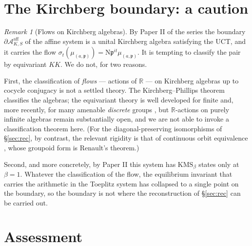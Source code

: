 \documentclass[11pt]{amsart}
\numberwithin{equation}{section}
\theoremstyle{definition}
\theoremstyle{remark}
\newtheorem{remark}[theorem]{Remark}
\newcommand{\R}{\mathbb{R}}
\newcommand{\cA}{\mathcal{A}}
\newcommand{\pp}{\mathfrak{p}}
\newcommand{\Ns}{\mathrm{N}}
\begin{document}
\section{The Kirchberg boundary: a caution}

\begin{remark}[Flows on Kirchberg algebras]\label{rem:kirchberg}
By Paper II of the series the boundary $\partial\cA^{\mathrm{aff}}_{K,S}$ of the affine
system is a unital Kirchberg algebra satisfying the UCT, and it carries the flow
$\sigma_t(\mu_{(a,\pp)})=\Ns\pp^{it}\mu_{(a,\pp)}$. It is tempting to classify the pair by
equivariant $KK$. We do not, for two reasons.

First, the classification of \emph{flows} --- actions of $\R$ --- on Kirchberg algebras up to
cocycle conjugacy is not a settled theory. The Kirchberg--Phillips theorem
\cite{KirchbergPhillips} classifies the algebras; the equivariant theory is well developed
for finite and, more recently, for many amenable \emph{discrete} groups \cite{Szabo}, but
$\R$-actions on purely infinite algebras remain substantially open, and we are not able to
invoke a classification theorem here. (For the diagonal-preserving isomorphisms of
\S\ref{sec:rec}, by contrast, the relevant rigidity is that of continuous orbit
equivalence \cite{Li,Matsumoto}, whose groupoid form is Renault's theorem.)

Second, and more concretely, by Paper II this system has
$\mathrm{KMS}_\beta$ states only at $\beta=1$. Whatever the classification of the flow, the
equilibrium invariant that carries the arithmetic in the Toeplitz system has collapsed to a
single point on the boundary, so the boundary is not where the reconstruction of
\S\ref{sec:rec} can be carried out.
\end{remark}

\section{Assessment}
\end{document}
